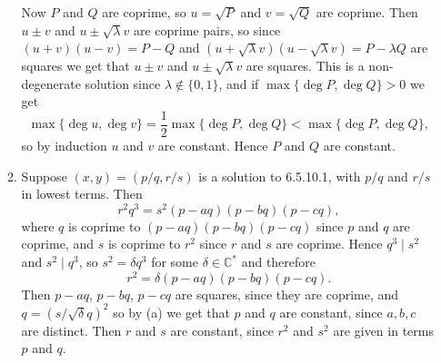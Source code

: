 \documentclass{report}
\newcommand{\divides}{\mathrel{\mid}} %
\newcommand{\C}{\mathbb{C}}
\begin{document}
\begin{enumerate}[label=\textbf{6.5.\Alph*.}]
\begin{enumerate}[label=(\alph*)]
		            Now $P$ and $Q$ are coprime, so $u=\sqrt{P}$ and $v=\sqrt{Q}$
		            are coprime. Then $u\pm v$ and $u\pm\sqrt\lambda v$ are coprime
		            pairs, so since $(u+v)(u-v)=P-Q$ and
		            $(u+\sqrt\lambda v)(u-\sqrt\lambda v)=P-\lambda Q$ are squares
		            we get that $u\pm v$ and $u\pm\sqrt\lambda v$ are squares.
		            This is a non-degenerate solution since $\lambda\notin\{0,1\}$,
		            and if $\max\{\deg P,\deg Q\}>0$ we get
		            \begin{equation*}
			            \max\{\deg u,\deg v\}
			            = \frac{1}{2}\max\{\deg P,\deg Q\}
			            < \max\{\deg P,\deg Q\},
		            \end{equation*}
		            so by induction $u$ and $v$ are constant. Hence $P$ and $Q$ are
		            constant.

		      \item Suppose $(x,y)=(p/q,r/s)$ is a solution to 6.5.10.1, with
		            $p/q$ and $r/s$ in lowest terms. Then
		            \begin{equation*}
			            r^2q^3 = s^2(p-aq)(p-bq)(p-cq),
		            \end{equation*}
		            where $q$ is coprime to $(p-aq)(p-bq)(p-cq)$ since $p$ and $q$
		            are coprime, and $s$ is coprime to $r^2$ since $r$ and $s$ are
		            coprime. Hence $q^3\divides s^2$ and $s^2\divides q^3$, so
		            $s^2=\delta q^3$ for some $\delta\in\C^*$ and therefore
		            \begin{equation*}
			            r^2 = \delta(p-aq)(p-bq)(p-cq).
		            \end{equation*}
		            Then $p-aq$, $p-bq$, $p-cq$ are squares, since they are coprime,
		            and $q=(s/\sqrt\delta q)^2$ so by (a) we get that $p$ and $q$
		            are constant, since $a,b,c$ are distinct. Then $r$ and $s$ are
		            constant, since $r^2$ and $s^2$ are given in terms $p$ and $q$.
	      \end{enumerate}
\end{enumerate}
\end{document}
